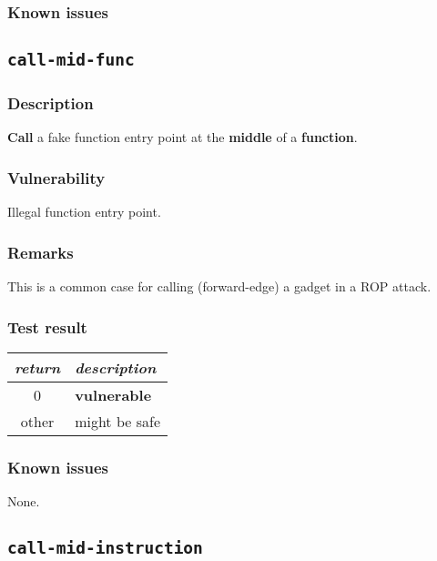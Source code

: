 \documentclass[a4paper]{book}
\begin{document}
\subsubsection{Known issues}

\newpage

\subsection{\texttt{call-mid-func}}\label{test-call-mid-func}

\subsubsection{Description}
\textbf{Call} a fake function entry point at the \textbf{middle} of a \textbf{function}.

\subsubsection{Vulnerability}
Illegal function entry point.

\subsubsection{Remarks}
This is a common case for calling (forward-edge) a gadget in a ROP attack.

\subsubsection{Test result}
\begin{tabular}{cl}
  \toprule
  \emph{return}  & \emph{description} \\
  \midrule
  0              & \textbf{vulnerable} \\
  other          & might be safe \\
  \bottomrule
\end{tabular}
  
\subsubsection{Known issues}

None.

\newpage
\subsection{\texttt{call-mid-instruction}}\label{test-call-mid-instruction}
\end{document}

